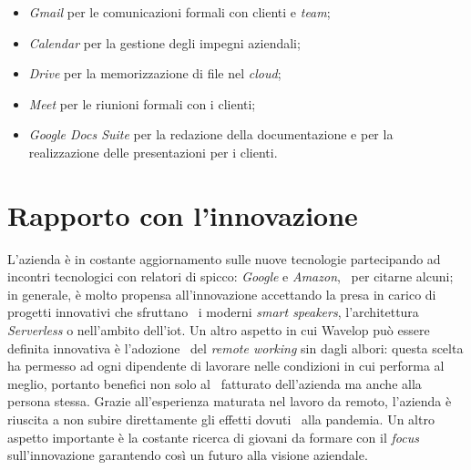\begin{itemize}
  \item \emph{Gmail} per le comunicazioni formali con clienti e \emph{team};
  \item \emph{Calendar} per la gestione degli impegni aziendali;
  \item \emph{Drive} per la memorizzazione di file nel \emph{cloud};
  \item \emph{Meet} per le riunioni formali con i clienti;
  \item \emph{Google Docs Suite} per la redazione della documentazione e per la realizzazione delle presentazioni per i clienti.
\end{itemize}

\section{Rapporto con l'innovazione}
L'azienda è in costante aggiornamento sulle nuove tecnologie partecipando ad incontri tecnologici con relatori di spicco: \emph{Google} e \emph{Amazon}, \
per citarne alcuni; in generale, è molto propensa all'innovazione accettando la presa in carico di progetti innovativi che sfruttano \
i moderni \emph{smart speakers}, l'architettura \emph{Serverless} o nell'ambito dell'\acrfull{iot}. Un altro aspetto in cui Wavelop può essere definita innovativa è l'adozione \
del \emph{remote working} sin dagli albori: questa scelta ha permesso ad ogni dipendente di lavorare nelle condizioni in cui performa al meglio, portanto benefici non solo al \
fatturato dell'azienda ma anche alla persona stessa. Grazie all'esperienza maturata nel lavoro da remoto, l'azienda è riuscita a non subire direttamente gli effetti dovuti \
alla pandemia. Un altro aspetto importante è la costante ricerca di giovani da formare con il \emph{focus} sull'innovazione garantendo così un futuro alla visione aziendale.